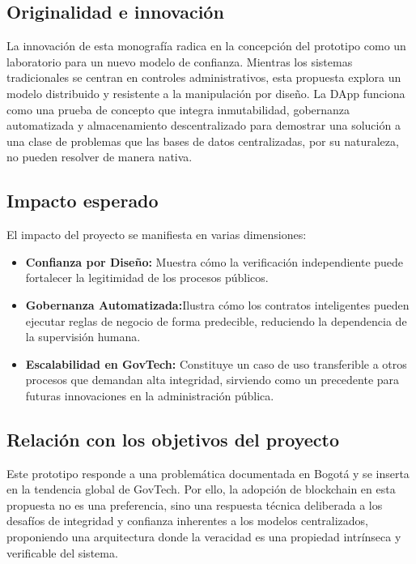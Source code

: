 \subsection{Originalidad e innovación}
La innovación de esta monografía radica en la concepción del prototipo como un laboratorio para un nuevo modelo de confianza. Mientras los sistemas tradicionales se centran en controles administrativos, esta propuesta explora un modelo distribuido y resistente a la manipulación por diseño. La DApp funciona como una prueba de concepto que integra inmutabilidad, gobernanza automatizada y almacenamiento descentralizado para demostrar una solución a una clase de problemas que las bases de datos centralizadas, por su naturaleza, no pueden resolver de manera nativa.

\subsection{Impacto esperado}
El impacto del proyecto se manifiesta en varias dimensiones: 
\begin{itemize}
\item \textbf{Confianza por Diseño:} Muestra cómo la verificación independiente puede fortalecer la legitimidad de los procesos públicos.
\item \textbf{Gobernanza Automatizada:}Ilustra cómo los contratos inteligentes pueden ejecutar reglas de negocio de forma predecible, reduciendo la dependencia de la supervisión humana.
\item \textbf{Escalabilidad en GovTech:} Constituye un caso de uso transferible a otros procesos que demandan alta integridad, sirviendo como un precedente para futuras innovaciones en la administración pública.
\end{itemize}

\subsection{Relación con los objetivos del proyecto} 
Este prototipo responde a una problemática documentada en Bogotá y se inserta en la tendencia global de GovTech. Por ello, la adopción de blockchain en esta propuesta no es una preferencia, sino una respuesta técnica deliberada a los desafíos de integridad y confianza inherentes a los modelos centralizados, proponiendo una arquitectura donde la veracidad es una propiedad intrínseca y verificable del sistema. 